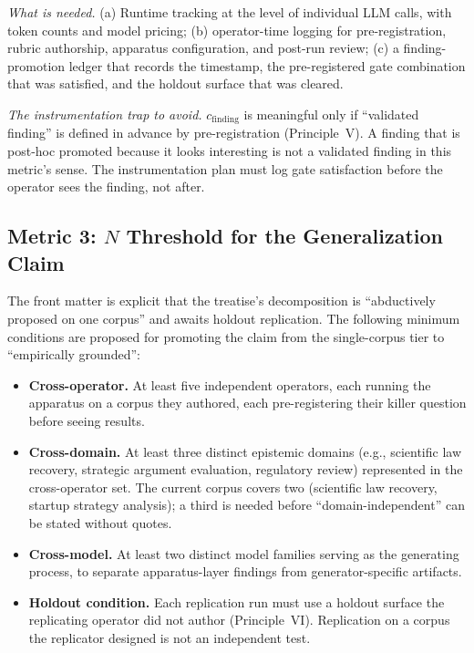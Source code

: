 \documentclass[11pt]{article}
\begin{document}
\emph{What is needed.} (a) Runtime tracking at the level of individual LLM calls, with token counts and model pricing; (b) operator-time logging for pre-registration, rubric authorship, apparatus configuration, and post-run review; (c) a finding-promotion ledger that records the timestamp, the pre-registered gate combination that was satisfied, and the holdout surface that was cleared.

\emph{The instrumentation trap to avoid.} $c_{\text{finding}}$ is meaningful only if ``validated finding'' is defined in advance by pre-registration (Principle~V). A finding that is post-hoc promoted because it looks interesting is not a validated finding in this metric's sense. The instrumentation plan must log gate satisfaction before the operator sees the finding, not after.

\subsection*{Metric 3: $N$ Threshold for the Generalization Claim}

The front matter is explicit that the treatise's decomposition is ``abductively proposed on one corpus'' and awaits holdout replication. The following minimum conditions are proposed for promoting the claim from the single-corpus tier to ``empirically grounded'':

\begin{itemize}
\item \textbf{Cross-operator.} At least five independent operators, each running the apparatus on a corpus they authored, each pre-registering their killer question before seeing results.
\item \textbf{Cross-domain.} At least three distinct epistemic domains (e.g., scientific law recovery, strategic argument evaluation, regulatory review) represented in the cross-operator set. The current corpus covers two (scientific law recovery, startup strategy analysis); a third is needed before ``domain-independent'' can be stated without quotes.
\item \textbf{Cross-model.} At least two distinct model families serving as the generating process, to separate apparatus-layer findings from generator-specific artifacts.
\item \textbf{Holdout condition.} Each replication run must use a holdout surface the replicating operator did not author (Principle~VI). Replication on a corpus the replicator designed is not an independent test.
\end{itemize}
\end{document}

